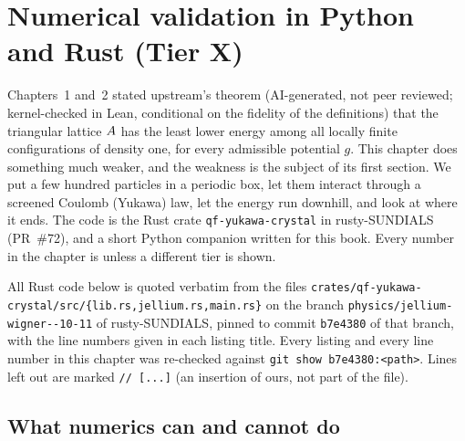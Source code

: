\chapter{Numerical validation in Python and Rust (Tier X)}\label{ch:numerics}

Chapters~1 and~2 stated upstream's theorem (AI-generated, not peer reviewed; kernel-checked in Lean, conditional on
the fidelity of the definitions) that the triangular lattice $A$ has the least lower energy among all
locally finite configurations of density one, for every admissible potential $g$. This chapter does something much
weaker, and the weakness is the subject of its first section. We put a few hundred particles in a periodic box, let
them interact through a screened Coulomb (Yukawa) law, let the energy run downhill, and look at where it ends. The
code is the Rust crate \texttt{qf-yukawa-crystal} in rusty-SUNDIALS~\cite{rusty} (PR~\#72), and a short Python
companion written for this book. Every number in the chapter is \tierX{} unless a different tier is shown.

All Rust code below is quoted verbatim from the files
\texttt{crates/\allowbreak qf-yukawa-crystal/\allowbreak src/\allowbreak \{lib.rs,\allowbreak jellium.rs,\allowbreak main.rs\}} on the branch
\texttt{physics/\allowbreak jellium-\allowbreak wigner--10-11} of rusty-SUNDIALS, pinned to commit
\texttt{b7e4380} of that branch, with the line numbers given in each listing title. Every listing and every line
number in this chapter was re-checked against \texttt{git show b7e4380:<path>}.
Lines left out are marked \texttt{// [...]} (an insertion of ours, not part of the file).

\section{What numerics can and cannot do}\label{sec:num-can}

